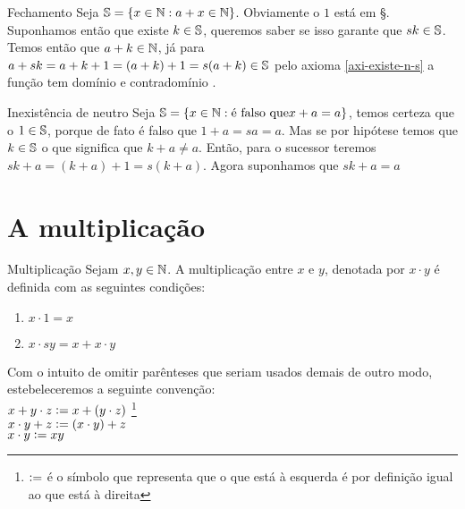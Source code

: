 \documentclass[../main.tex]{subfiles}
\begin{document}
\begin{dem}{Fechamento}
    Seja $\S = \{ x \in \N : a + x \in \N \}$. Obviamente o $1$ está em \S. Suponhamos então que existe $k \in \S$, queremos saber se isso garante que $sk \in \S$. Temos então que $a + k \in \N$, já para $a + sk = a + k + 1 = (a + k) + 1 = s(a + k) \in \S$ pelo axioma \ref{axi-existe-n-s} a função tem domínio e contradomínio \N.     
\end{dem}


\begin{dem}{Inexistência de neutro}
    Seja $\S = \{ x \in \N : \text{é falso que} x + a = a \}$, temos certeza que o $1 \in \S$, porque de fato é falso que $1 + a = sa = a$. Mas se por hipótese temos que $k \in \S$ o que significa que $k + a \neq a$. Então, para o sucessor teremos $sk + a = (k + a) + 1 = s(k + a)$. Agora suponhamos que $sk + a = a$
\end{dem}

\section{A multiplicação}
\begin{defi}{Multiplicação}\label{def-multiplicacao-N}
    Sejam $x, y \in \N$. A multiplicação entre $x$ e $y$, denotada por $x \cdot y$ é definida com as seguintes condições: 
	\begin{enumerate}[label=(\roman*)]
		\item $x \cdot 1 = x$
		\item $x \cdot sy = x + x \cdot y$
	\end{enumerate}
\end{defi}
\begin{obs}
	Com o intuito de omitir parênteses que seriam usados demais de outro modo, estebeleceremos a seguinte convenção: \\
	$x + y \cdot z \defeq x + (y \cdot z)$ \footnote{$\defeq$ é o símbolo que representa que o que está à esquerda é por definição igual ao que está à direita} \\
	$x \cdot y + z \defeq (x \cdot y) + z$ \\
	$x \cdot y \defeq xy$
\end{obs}
\end{document}
